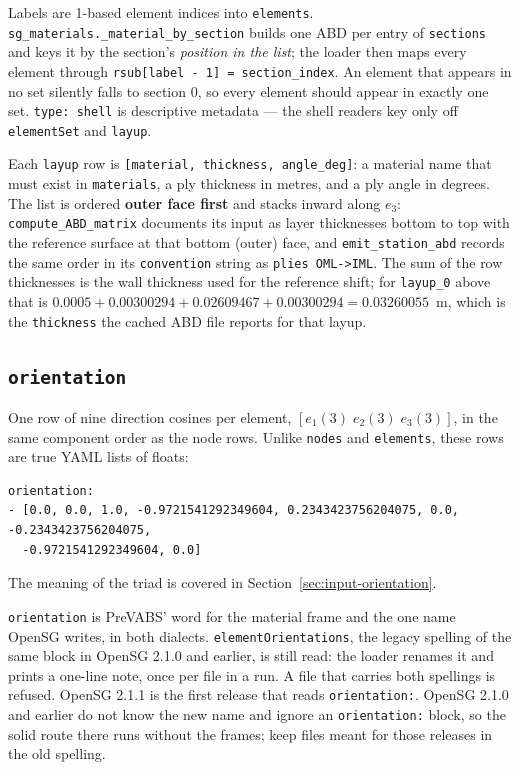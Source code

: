 Labels are 1-based element indices into \texttt{elements}.
\texttt{sg\_materials.\_material\_by\_section} builds one ABD per entry of
\texttt{sections} and keys it by the section's \emph{position in the list}; the
loader then maps every element through \texttt{rsub[label - 1] =
section\_index}. An element that appears in no set silently falls to section 0,
so every element should appear in exactly one set. \texttt{type: shell} is
descriptive metadata --- the shell readers key only off \texttt{elementSet} and
\texttt{layup}.

Each \texttt{layup} row is \texttt{[material, thickness, angle\_deg]}: a
material name that must exist in \texttt{materials}, a ply thickness in metres,
and a ply angle in degrees. The list is ordered \textbf{outer face first} and
stacks inward along $e_3$: \texttt{compute\_ABD\_matrix} documents its input as
layer thicknesses bottom to top with the reference surface at that bottom
(outer) face, and \texttt{emit\_station\_abd} records the same order in its
\texttt{convention} string as \texttt{plies OML->IML}. The sum of the row
thicknesses is the wall thickness used for the reference shift; for
\texttt{layup\_0} above that is $0.0005 + 0.00300294 + 0.02609467 + 0.00300294 =
0.03260055$~m, which is the \texttt{thickness} the cached ABD file reports for
that layup.

\subsection{\texttt{orientation}}

One row of nine direction cosines per element, $[e_1(3)\;e_2(3)\;e_3(3)]$, in the
same component order as the node rows. Unlike \texttt{nodes} and
\texttt{elements}, these rows are true YAML lists of floats:

\begin{lstlisting}[style=shellst,caption={One orientation row: e1 = [0,0,1] out of plane, then the in-plane e2 and e3.},basicstyle=\ttfamily\footnotesize]
orientation:
- [0.0, 0.0, 1.0, -0.9721541292349604, 0.2343423756204075, 0.0, -0.2343423756204075,
  -0.9721541292349604, 0.0]
\end{lstlisting}

The meaning of the triad is covered in Section~\ref{sec:input-orientation}.

\texttt{orientation} is PreVABS' word for the material frame and the one name
OpenSG writes, in both dialects. \texttt{elementOrientations}, the legacy
spelling of the same block in OpenSG 2.1.0 and earlier, is still read: the
loader renames it and prints a one-line note, once per file in a run. A file
that carries both spellings is refused. OpenSG 2.1.1 is the first release that
reads \texttt{orientation:}. OpenSG 2.1.0 and earlier do not know the new name
and ignore an \texttt{orientation:} block, so the solid route there runs
without the frames; keep files meant for those releases in the old spelling.

